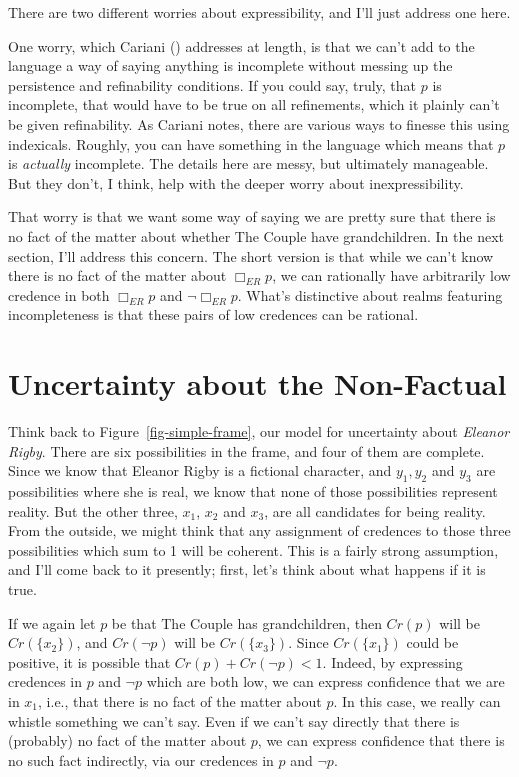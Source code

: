 \documentclass[
  11pt,
  letterpaper,
  DIV=11,
  numbers=noendperiod,
  twoside]{scrartcl}
\newcounter{none} %
\begin{document}
There are two different worries about expressibility, and I'll just
address one here.

One worry, which Cariani () addresses
at length, is that we can't add to the language a way of saying anything
is incomplete without messing up the persistence and refinability
conditions. If you could say, truly, that \(p\) is incomplete, that
would have to be true on all refinements, which it plainly can't be
given refinability. As Cariani notes, there are various ways to finesse
this using indexicals. Roughly, you can have something in the language
which means that \(p\) is \emph{actually} incomplete. The details here
are messy, but ultimately manageable. But they don't, I think, help with
the deeper worry about inexpressibility.

That worry is that we want some way of saying we are pretty sure that
there is no fact of the matter about whether The Couple have
grandchildren. In the next section, I'll address this concern. The short
version is that while we can't know there is no fact of the matter about
\(\Box_{ER}p\), we can rationally have arbitrarily low credence in both
\(\Box_{ER}p\) and \(\neg \Box_{ER}p\). What's distinctive about realms
featuring incompleteness is that these pairs of low credences can be
rational.

\section{Uncertainty about the Non-Factual}\label{sec-sec4}

Think back to Figure~\ref{fig-simple-frame}, our model for uncertainty
about \emph{Eleanor Rigby}. There are six possibilities in the frame,
and four of them are complete. Since we know that Eleanor Rigby is a
fictional character, and \(y_1, y_2\) and \(y_3\) are possibilities
where she is real, we know that none of those possibilities represent
reality. But the other three, \(x_1\), \(x_2\) and \(x_3\), are all
candidates for being reality. From the outside, we might think that any
assignment of credences to those three possibilities which sum to 1 will
be coherent. This is a fairly strong assumption, and I'll come back to
it presently; first, let's think about what happens if it is true.

If we again let \(p\) be that The Couple has grandchildren, then
\(Cr(p)\) will be \(Cr(\{x_2\})\), and \(Cr(\neg p)\) will be
\(Cr(\{x_3\})\). Since \(Cr(\{x_1\})\) could be positive, it is possible
that \(Cr(p) + Cr(\neg p) < 1\). Indeed, by expressing credences in
\(p\) and \(\neg p\) which are both low, we can express confidence that
we are in \(x_1\), i.e., that there is no fact of the matter about
\(p\). In this case, we really can whistle something we can't say. Even
if we can't say directly that there is (probably) no fact of the matter
about \(p\), we can express confidence that there is no such fact
indirectly, via our credences in \(p\) and \(\neg p\).
\end{document}
